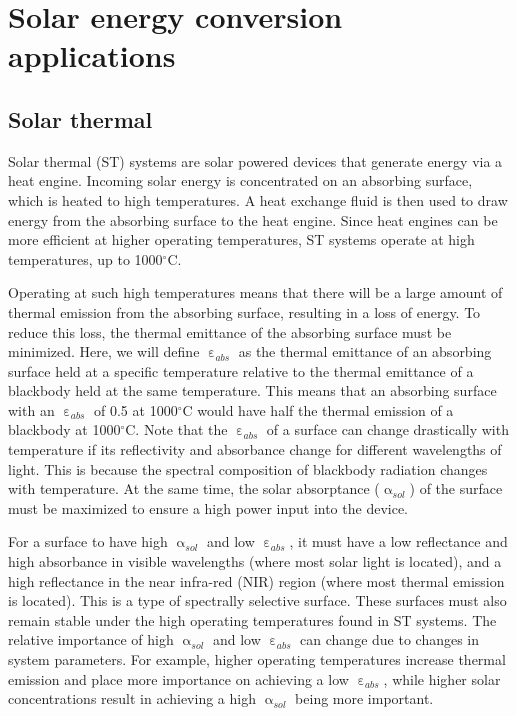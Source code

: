 \documentclass[review]{elsarticle}
\begin{document}
\section{Solar energy conversion applications}
\subsection{Solar thermal}
Solar thermal (ST) systems are solar powered devices that generate energy via a heat engine.  Incoming solar energy is concentrated on an absorbing surface, which is heated to high temperatures.  A heat exchange fluid is then used to draw energy from the absorbing surface to the heat engine.  Since heat engines can be more efficient at higher operating temperatures, ST systems operate at high temperatures, up to 1000$^\circ$C.

Operating at such high temperatures means that there will be a large amount of thermal emission from the absorbing surface, resulting in a loss of energy.  To reduce this loss, the thermal emittance of the absorbing surface must be minimized.  Here, we will define $\upepsilon_{abs}$ as the thermal emittance of an absorbing surface held at a specific temperature relative to the thermal emittance of a blackbody held at the same temperature.  This means that an absorbing surface with an $\upepsilon_{abs}$ of 0.5 at 1000$^\circ$C would have half the thermal emission of a blackbody at 1000$^\circ$C.  Note that the $\upepsilon_{abs}$ of a surface can change drastically with temperature if its reflectivity and absorbance change for different wavelengths of light.  This is because the spectral composition of blackbody radiation changes with temperature.  At the same time, the solar absorptance ($\upalpha_{sol}$) of the surface must be maximized to ensure a high power input into the device.

For a surface to have high $\upalpha_{sol}$ and low $\upepsilon_{abs}$, it must have a low reflectance and high absorbance in visible wavelengths (where most solar light is located), and a high reflectance in the near infra-red (NIR) region (where most thermal emission is located).  This is a type of spectrally selective surface.  These surfaces must also remain stable under the high operating temperatures found in ST systems.  The relative importance of high $\upalpha_{sol}$ and low $\upepsilon_{abs}$ can change due to changes in system parameters.  For example, higher operating temperatures increase thermal emission and place more importance on achieving a low $\upepsilon_{abs}$, while higher solar concentrations result in achieving a high $\upalpha_{sol}$ being more important.
\end{document}
